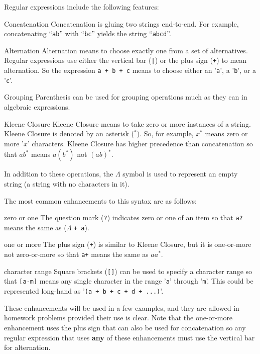 \documentclass[letterpaper,12pt,openany,reqno]{book}%
\newcommand{\code}[1] {\lstinline[breaklines=yes,breakatwhitespace=yes]{#1}}
\newenvironment{mydesc}[1][9em]
  {
     \begin{basedescript}
     {
      \renewcommand{\makelabel}[1]{\bfseries##1}
      \desclabelwidth{ #1 }
      \desclabelstyle{\multilinelabel}
     }
  }
  {
     \end{basedescript}%
  }
\begin{document}
Regular expressions include the following features:
\begin{mydesc}[10em]
	\item[Concatenation] Concatenation is gluing two strings end-to-end. For example, concatenating ``\code{ab}'' with ``\code{bc}'' yields the string ``\code{abcd}''.
  \item[Alternation] Alternation means to choose exactly one from a set of alternatives. Regular expressions use either the vertical bar (\code{|}) or the plus sign (\code{+}) to mean alternation. So the expression \code{a + b + c} means to choose either an '\code{a}', a '\code{b}', or a '\code{c}'. 
	\item[Grouping] Parenthesis can be used for grouping operations much as they can in algebraic expressions.
	\item[Kleene Closure] Kleene Closure means to take zero or more instances of a string. Kleene Closure is denoted by an asterisk ($^*$). So, for example, $x^*$ means zero or more '$x$' characters. Kleene Closure has higher precedence than concatenation so that $ab^*$ means $a(b^*)$ not $(ab)^*$.
\end{mydesc}

In addition to these operations, the $\Lambda$ symbol is used to represent an empty string (a string with no characters in it).

The most common enhancements to this syntax are as follows:
\begin{mydesc}
\item[zero or one] The question mark
 (\code{?}) 
indicates zero or one of an item so that \code{a?} 
means the same as ($\Lambda$ \code{+ a}).
\item[one or more] The plus sign (\code{+}) is similar to Kleene Closure, but it is one-or-more not zero-or-more so that \code{a+} means the same as $aa^*$.
\item[character range] Square brackets (\code{[]}) can be used to specify a character range so that \code{[a-m]} means any single character in the range '\code{a}' through '\code{m}'. This could be represented long-hand as '\code{(a + b + c + d + ...)}'.
\end{mydesc}

These enhancements will be used in a few examples, and they are allowed in homework problems provided their use is clear. Note that the one-or-more enhancement uses the plus sign that can also be used for concatenation so any regular expression that uses \textbf{any} of these enhancements must use the vertical bar for alternation.
\end{document}
